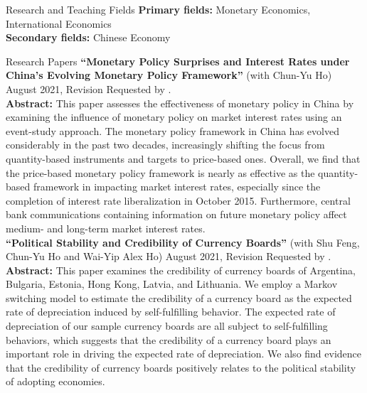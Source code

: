 \documentclass{resume_liang} %
\begin{document}
\begin{rSection}{Research and Teaching Fields}
{\bf Primary fields:} Monetary Economics, International Economics \vspace{0.1cm}\\ 
{\bf Secondary fields:} Chinese Economy  \\
\end{rSection}
\bigskip \bigskip






\begin{rSection}{Research Papers}
\textbf{``Monetary Policy Surprises and Interest Rates under China's Evolving Monetary Policy Framework''} (with Chun-Yu Ho) August 2021, Revision Requested by \textit{\color{blue}{Emerging Markets Review}}.\vspace{0.1cm}\\ 
\textbf{Abstract:} This paper assesses the effectiveness of monetary policy in China by examining the influence of monetary policy on market interest rates using an event-study approach. The monetary policy framework in China has evolved considerably in the past two decades, increasingly shifting the focus from quantity-based instruments and targets to price-based ones. Overall, we find that the price-based monetary policy framework is nearly as effective as the quantity-based framework in impacting market interest rates, especially since the completion of interest rate liberalization in October 2015. Furthermore, central bank communications containing information on future monetary policy affect medium- and long-term market interest rates.\vspace{0.2cm}\\
\textbf{``Political Stability and Credibility of Currency Boards''} (with Shu Feng, Chun-Yu Ho and Wai-Yip Alex Ho) August 2021, Revision Requested by \textit{\color{blue}{Journal of International Money and Finance}}.\vspace{0.1cm}\\
\textbf{Abstract:} This paper examines the credibility of currency boards of Argentina, Bulgaria, Estonia, Hong Kong, Latvia, and Lithuania. We employ a Markov switching model to estimate the credibility of a currency board as the expected rate of depreciation induced by self-fulfilling behavior. The expected rate of depreciation of our sample currency boards are all subject to self-fulfilling behaviors, which suggests that the credibility of a currency board plays an important role in driving the expected rate of depreciation. We also find evidence that the credibility of currency boards positively relates to the political stability of adopting economies.\vspace{0.1cm}\\

\end{rSection}
\end{document}
